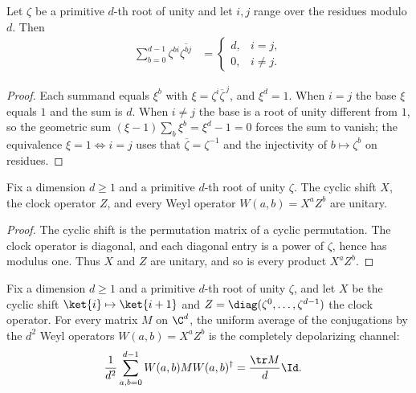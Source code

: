 \begin{lemma}
    \label{lem:root_of_unity_orthogonality}
    \leanok
    Let $\zeta$ be a primitive $d$-th root of unity and let $i,j$ range over the
    residues modulo $d$. Then
    \begin{align}
        \sum_{b=0}^{d-1}\zeta^{bi}\overline{\zeta^{bj}}
         & =
        \begin{cases}
            d, & i=j,    \\
            0, & i\ne j.
        \end{cases}
        \label{eq:entropy_root_orthogonality}
    \end{align}
\end{lemma}

\begin{proof}\leanok
    Each summand equals $\xi^b$ with
    $\xi=\zeta^i\overline{\zeta}^{\,j}$, and $\xi^d=1$. When $i=j$ the
    base $\xi$ equals $1$ and the sum is $d$. When $i\ne j$ the base is a root of
    unity different from $1$, so the geometric sum
    $(\xi-1)\sum_b\xi^b=\xi^d-1=0$ forces the sum to vanish; the
    equivalence $\xi=1\iff i=j$ uses that
    $\overline{\zeta}=\zeta^{-1}$ and the injectivity of
    $b\mapsto\zeta^b$ on residues.
\end{proof}

\begin{theorem}
    \label{thm:weyl_operator_unitary}
    \leanok
    Fix a dimension $d\ge1$ and a primitive $d$-th root of unity $\zeta$.
    The cyclic shift $X$, the clock operator $Z$, and every Weyl operator
    $W(a,b)=X^aZ^b$ are unitary.
\end{theorem}

\begin{proof}\leanok
    The cyclic shift is the permutation matrix of a cyclic permutation. The
    clock operator is diagonal, and each diagonal entry is a power of $\zeta$,
    hence has modulus one. Thus $X$ and $Z$ are unitary, and so is every product
    $X^aZ^b$.
\end{proof}

\begin{theorem}
    \label{thm:weyl_twirl}
    \leanok
    Fix a dimension $d\ge1$ and a primitive $d$-th root of unity $\zeta$, and
    let $X$ be the cyclic shift $\ket{i}\mapsto\ket{i+1}$ and
    $Z=\diag(\zeta^0,\ldots,\zeta^{d-1})$ the clock operator. For
    every matrix $M$ on $\C^d$, the uniform average of the conjugations
    by the $d^2$ Weyl operators $W(a,b)=X^aZ^b$ is the completely depolarizing
    channel:
    \begin{align}
        \frac{1}{d^2}\sum_{a,b=0}^{d-1}
        W(a,b)MW(a,b)^\dagger
         & =\frac{\tr M}{d}\Id.
        \label{eq:entropy_weyl_twirl}
    \end{align}
\end{theorem}

